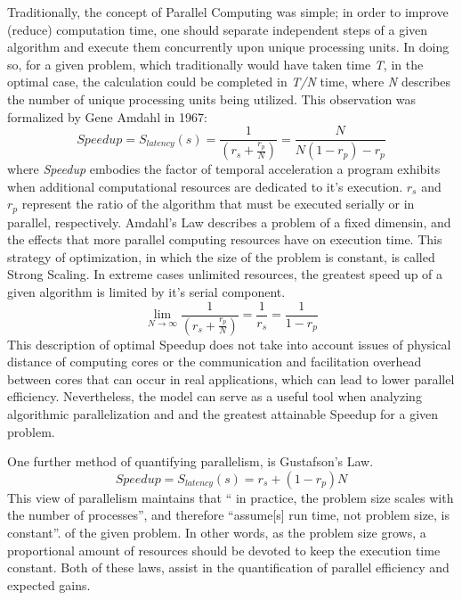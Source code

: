 Traditionally, the concept of Parallel Computing was simple; in order to improve
(reduce) computation time, one should separate independent steps of a given algorithm
and execute them concurrently upon unique processing units.  In doing so, for a given
problem, which traditionally would have taken time \textit{T}, in the optimal case,
the calculation could be completed in \textit{T/N} time, where \textit{N} describes
the number of unique processing units being utilized.  This observation was formalized
by Gene Amdahl in 1967\cite{Wilt}:
%
\begin{equation}
  \tag{Amdahl's Law}
  Speedup = S_{latency}(s)= \frac{1}{(r_{s} + \frac{r_{p}}{N})} = \frac{N}{N(1-r_{p})-r_{p}}
  \label{egn:Amdahl}
\end{equation}
%
where \textit{Speedup} embodies the factor of temporal acceleration a program
exhibits when additional computational resources are dedicated to it's execution.
 \textit{$r_{s}$} and \textit{$ r_{p} $} represent the ratio of the algorithm that must be executed serially or in parallel, respectively.  Amdahl's Law describes a problem of a fixed dimensin,
and the effects that more parallel computing resources have on execution time.
This strategy of optimization, in which the size of the problem is constant,
 is called Strong Scaling.
In extreme cases unlimited resources, the greatest speed up of a given algorithm
 is limited by it's serial component.
%
\begin{equation}
 \lim_{N\to\infty}  \frac{1}{(r_{s} + \frac{r_{p}}{N})} = \frac{1}{r_{s}} = \frac{1}{1-r_{p}}
\end{equation}
%
This description of optimal Speedup does not take into account issues of physical
distance of computing cores or the communication and facilitation overhead between
cores that can occur in real applications, which can lead to lower parallel efficiency.
Nevertheless, the model can serve as a useful tool when analyzing algorithmic
parallelization and and the greatest attainable Speedup for a given problem.\par

One further method of quantifying parallelism, is Gustafson's Law\cite{Gustafson}.
%
\begin{equation}
  \tag{Gustofson's Law}
  Speedup = S_{latency}(s) = r_{s} + (1 - r_{p})N
\end{equation}
%
This view of parallelism maintains that `` in practice, the problem
size scales with the number of processes'', and therefore
``assume[s] run time, not problem size, is constant''.
of the given problem. In other words, as the problem size grows, a proportional
amount of resources should be devoted to keep the execution time constant.
Both of these laws, assist in the quantification of parallel efficiency and
expected gains.

